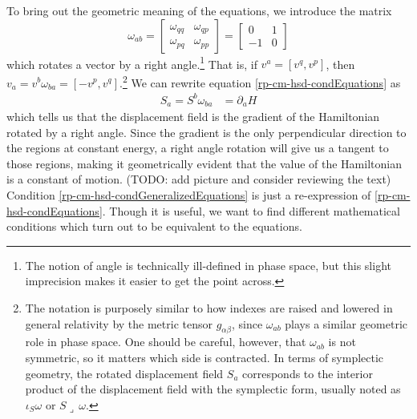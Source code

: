 To bring out the geometric meaning of the equations, we introduce the matrix
\begin{equation}\label{rp-cm-symplectic1d}
	\tag{SF-1}
	\omega_{ab} = \left[\begin{array}{cc}
		\omega_{qq} & \omega_{qp} \\
		\omega_{pq} & \omega_{pp} 
	\end{array} \right]= \left[\begin{array}{cc}
		0 & 1 \\
		-1 & 0 
	\end{array} \right]
\end{equation}
which rotates a vector by a right angle.\footnote{The notion of angle is technically ill-defined in phase space, but this slight imprecision makes it easier to get the point across.} That is, if $v^a = [v^q, v^p]$, then $v_a = v^b \omega_{ba}  = [-v^p, v^q]$.\footnote{The notation is purposely similar to how indexes are raised and lowered in general relativity by the metric tensor $g_{\alpha\beta}$, since $\omega_{ab}$ plays a similar geometric role in phase space. One should be careful, however, that $\omega_{ab}$ is not symmetric, so it matters which side is contracted. In terms of symplectic geometry, the rotated displacement field $S_a$ corresponds to the interior product of the displacement field with the symplectic form, usually noted as $\iota_S \omega$ or $S \lrcorner \, \omega$.} We can rewrite equation \ref{rp-cm-hsd-condEquations} as
\begin{equation}\label{rp-cm-hsd-condGeneralizedEquations}
	\tag{HM-1G}
	\begin{aligned}
		S_a = S^b \omega_{ba} &= \partial_a H 
	\end{aligned}
\end{equation}
which tells us that the displacement field is the gradient of the Hamiltonian rotated by a right angle. Since the gradient is the only perpendicular direction to the regions at constant energy, a right angle rotation will give us a tangent to those regions, making it geometrically evident that the value of the Hamiltonian is a constant of motion. (TODO: add picture and consider reviewing the text) Condition \ref{rp-cm-hsd-condGeneralizedEquations} is just a re-expression of \ref{rp-cm-hsd-condEquations}. Though it is useful, we want to find different mathematical conditions which turn out to be equivalent to the equations.

